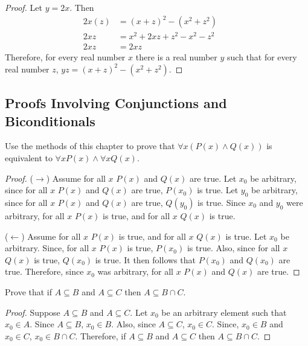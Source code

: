 \begin{proof}
    Let $y = 2x$. Then 
    \begin{align*}
        2x(z) & = {(x + z)}^2 - (x^2 + z^2)   &  & \\
        2xz   & = x^2 + 2xz + z^2 - x^2 - z^2 &  & \\
        2xz   & = 2xz
    \end{align*}
    Therefore, for every real number $x$ there is a real
    number $y$ such that for every real number $z$, $yz = {(x + z)}^2 - (x^2 + z^2)$.
\end{proof}

\subsection{Proofs Involving Conjunctions and Biconditionals}

\begin{tcolorbox}[title=Problem 1, breakable]
    Use the methods of this chapter to prove that $\forall{x}(P(x) \wedge Q(x))$
    is equivalent to $\forall{x}P(x) \wedge \forall{x}Q(x)$.
\end{tcolorbox}

\begin{proof}
    ($\rightarrow$) Assume for all $x$ $P(x)$ and $Q(x)$ are true.
    Let $x_0$ be arbitrary, since for all $x$ $P(x)$ and $Q(x)$ are true, $P(x_0)$ is true.
    Let $y_0$ be arbitrary, since for all $x$ $P(x)$ and $Q(x)$ are true, $Q(y_0)$ is true.
    Since $x_0$ and $y_0$ were arbitrary, for all $x$ $P(x)$ is true, and for all $x$ $Q(x)$ is true.

    ($\leftarrow$) Assume for all $x$ $P(x)$ is true, and 
    for all $x$ $Q(x)$ is true.
    Let $x_0$ be arbitrary. Since, for all $x$ $P(x)$ is true,
    $P(x_0)$ is true. Also, since for all $x$ $Q(x)$ is true,
    $Q(x_0)$ is true. It then follows that $P(x_0)$ and $Q(x_0)$ are true.
    Therefore, since $x_0$ was arbitrary, for all $x$
    $P(x)$ and $Q(x)$ are true.
\end{proof}

\begin{tcolorbox}[title=Problem 2, breakable]
    Prove that if $A \subseteq B$ and $A \subseteq C$ then $A \subseteq B \cap C$.
\end{tcolorbox}

\begin{proof}
    Suppose $A \subseteq B$ and $A \subseteq C$.
    Let $x_0$ be an arbitrary element such that $x_0 \in A$.
    Since $A \subseteq B$, $x_0 \in B$.
    Also, since $A \subseteq C$, $x_0 \in C$.
    Since, $x_0 \in B$ and $x_0 \in C$, $x_0 \in B \cap C$.
    Therefore, if $A \subseteq B$ and $A \subseteq C$ then $A \subseteq B \cap C$.
\end{proof}

